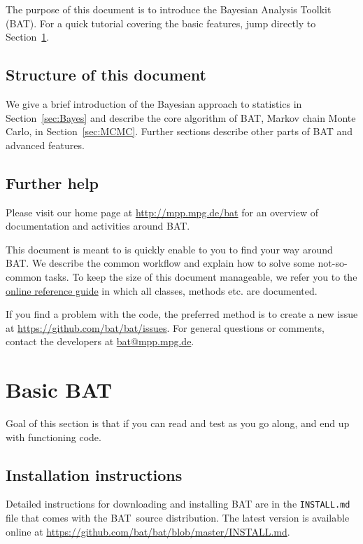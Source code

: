 \documentclass[11pt, a4paper]{article}
\newcommand{\bat}{{\sc BAT}}
\newcommand{\fred}[1]{{\color{blue}{Fred: #1}}}
\def \refsec#1{Section~\ref{sec:#1}}
\begin{document}
\fred{what is this for, web page, reference guide, github, teaser}

The purpose of this document is to introduce the Bayesian Analysis
Toolkit (BAT). For a quick tutorial covering the basic features, jump
directly to \refsec{basics}.

\subsection*{Structure of this document}

We give a brief introduction of the Bayesian approach to statistics in
\refsec{Bayes} and describe the core algorithm of \bat{}, Markov chain
Monte Carlo, in \refsec{MCMC}. Further sections describe other parts
of \bat{} and advanced features.

\subsection*{Further help}

Please visit our home page at \url{http://mpp.mpg.de/bat} for an
overview of documentation and activities around \bat{}.

This document is meant to is quickly enable to you to find your way
around \bat{}. We describe the common workflow and explain how to
solve some not-so-common tasks. To keep the size of this document
manageable, we refer you to the
\href{http://mpp.mpg.de/bat/docs/refman/latest/}{online reference
  guide} in which all classes, methods etc. are documented.

If you find a problem with the code, the preferred method is to create
a new issue at \url{https://github.com/bat/bat/issues}. For general
questions or comments, contact the developers at
\href{mailto:bat@mpp.mpg.de}{bat@mpp.mpg.de}.

\section{Basic BAT} \label{sec:basics}

Goal of this section is that if you can read and test as you go along, and end up with functioning code.

\subsection{Installation instructions}

Detailed instructions for downloading and installing BAT are in the
\verb|INSTALL.md| file that comes with the \bat\ source distribution. The
latest version is available online at
\url{https://github.com/bat/bat/blob/master/INSTALL.md}.
\end{document}
